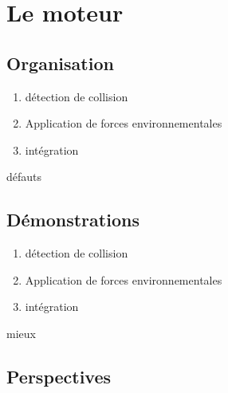 \documentclass{beamer}
\begin{document}
\section{Le moteur}

\subsection{Organisation}

\begin{frame}
  \begin{enumerate}
    \item détection de collision
    \item Application de forces environnementales
    \item intégration
  \end{enumerate}

  défauts
\end{frame}

\subsection{Démonstrations}

\begin{frame}
  \begin{enumerate}
    \item détection de collision
    \item Application de forces environnementales
    \item intégration
  \end{enumerate}

  mieux
\end{frame}

\subsection{Perspectives}

\begin{frame}
  \begin{figure}
    \centering
    
    
    
  \end{figure}
\end{frame}

\begin{frame}
  
\end{frame}
\end{document}
